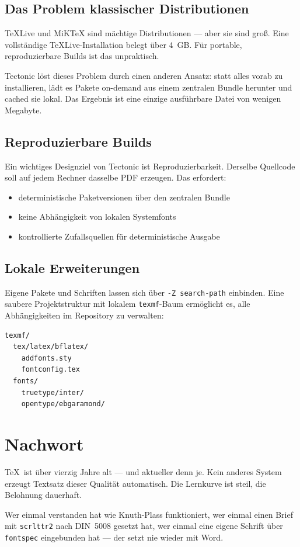 \documentclass[
]{bfbook}
\begin{document}
\section{Das Problem klassischer Distributionen}

TeXLive und MiKTeX sind mächtige Distributionen — aber sie sind groß.
Eine vollständige TeXLive-Installation belegt über 4~GB. Für portable,
reproduzierbare Builds ist das unpraktisch.

Tectonic löst dieses Problem durch einen anderen Ansatz: statt alles
vorab zu installieren, lädt es Pakete on-demand aus einem zentralen
Bundle herunter und cached sie lokal. Das Ergebnis ist eine einzige
ausführbare Datei von wenigen Megabyte.

\section{Reproduzierbare Builds}

Ein wichtiges Designziel von Tectonic ist Reproduzierbarkeit. Derselbe
Quellcode soll auf jedem Rechner dasselbe PDF erzeugen. Das erfordert:

\begin{itemize}
  \item deterministische Paketversionen über den zentralen Bundle
  \item keine Abhängigkeit von lokalen Systemfonts
  \item kontrollierte Zufallsquellen für deterministische Ausgabe
\end{itemize}

\section{Lokale Erweiterungen}

Eigene Pakete und Schriften lassen sich über \texttt{-Z search-path}
einbinden. Eine saubere Projektstruktur mit lokalem \texttt{texmf}-Baum
ermöglicht es, alle Abhängigkeiten im Repository zu verwalten:

\begin{verbatim}
texmf/
  tex/latex/bflatex/
    addfonts.sty
    fontconfig.tex
  fonts/
    truetype/inter/
    opentype/ebgaramond/
\end{verbatim}

\backmatter

\chapter{Nachwort}

\TeX\ ist über vierzig Jahre alt — und aktueller denn je. Kein anderes
System erzeugt Textsatz dieser Qualität automatisch. Die Lernkurve ist
steil, die Belohnung dauerhaft.

Wer einmal verstanden hat wie Knuth-Plass funktioniert, wer einmal
einen Brief mit \texttt{scrlttr2} nach DIN~5008 gesetzt hat, wer einmal
eine eigene Schrift über \texttt{fontspec} eingebunden hat — der setzt
nie wieder mit Word.



\end{document}
